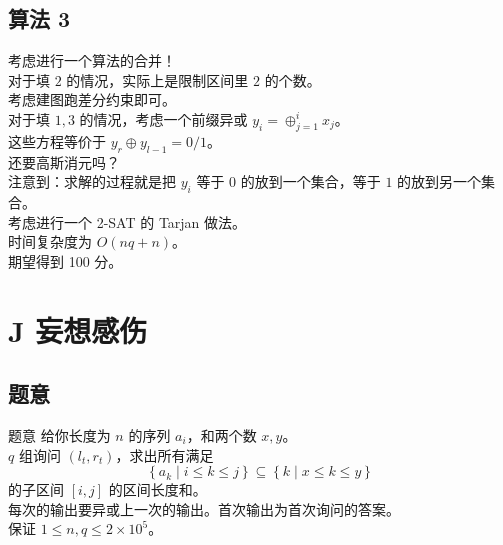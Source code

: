 \documentclass[11pt, fontset = fandol]{ctexbeamer}
\begin{document}
\subsection{算法 3}
\begin{frame}
  \pause
  考虑进行一个算法的合并！\\
  \pause
  对于填 $2$ 的情况，实际上是限制区间里 $2$ 的个数。\\
  \pause
  考虑建图跑差分约束即可。\\
  \pause
  对于填 $1, 3$ 的情况，考虑一个前缀异或 $y_i = \oplus_{j=1}^{i} x_j$。\\
  \pause
  这些方程等价于 $y_r \oplus y_{l-1} = 0 / 1$。\\
  \pause
  还要高斯消元吗？\\
  \pause
  注意到：求解的过程就是把 $y_i$ 等于 $0$ 的放到一个集合，等于 $1$ 的放到另一个集合。\\
  \pause
  考虑进行一个 2-SAT 的 Tarjan 做法。\\
  \pause
  时间复杂度为 $O(nq + n)$。\\
  期望得到 100 分。
\end{frame}

\section{J 妄想感伤}
\subsection{题意}
\begin{frame}
  \begin{block}{题意}
    给你长度为 $n$ 的序列 $a_i$，和两个数 $x, y$。\\
    $q$ 组询问 $\left(l_t, r_t\right)$，求出所有满足\\
    $$\left\{a_k \mid i \le k \le j\right\} \subseteq \left\{k \mid x \le k \le y\right\}$$
    的子区间 $\left[i, j\right]$ 的区间长度和。\\
    每次的输出要异或上一次的输出。首次输出为首次询问的答案。\\
    保证 $1 \le n, q \le 2 \times {10}^5$。
  \end{block}
\end{frame}
\end{document}
